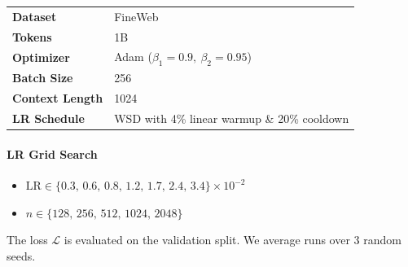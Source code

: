 \documentclass{article} %
\begin{document}
\begin{table}[ht]
\centering
\small
\renewcommand{\arraystretch}{1.2}
\begin{tabular}{@{}ll@{}}
\toprule
\textbf{Dataset}       & FineWeb                                        \\ 
\addlinespace
\textbf{Tokens}        & 1B                                                   \\ 
\addlinespace
\textbf{Optimizer}     & Adam ($\beta_1=0.9,\ \beta_2=0.95$) \\

\addlinespace
\textbf{Batch Size}     & 256 \\

\addlinespace
\textbf{Context Length}     & 1024 \\

\addlinespace
\textbf{LR Schedule}   & WSD with 4\% linear warmup \& 20\% cooldown         \\ 
\bottomrule
\end{tabular}
\end{table}



\paragraph{LR Grid Search}
\begin{itemize}[nosep,leftmargin=*]
  \item \(\displaystyle \mathrm{LR} \in \{0.3,\, 0.6,\, 0.8,\, 1.2,\, 1.7,\, 2.4,\, 3.4
\}\times10^{-2}\)
  
  \vspace{2mm}
  
  \item \(n \in \{128,\,256,\,512,\,1024,\,2048\}\)
\end{itemize}
The loss \(\mathcal{L}\) is evaluated on the validation split. We average runs over 3 random seeds.
\end{document}
